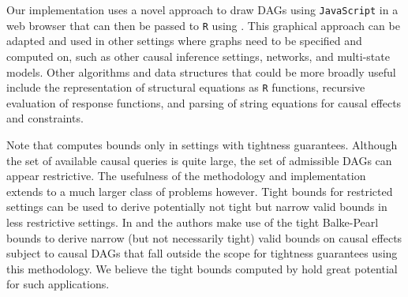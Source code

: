 Our implementation uses a novel approach to draw DAGs using \texttt{JavaScript} in a web browser that can then be passed to \texttt{R} using . This graphical approach can be adapted and used in other settings where graphs need to be specified and computed on, such as other causal inference settings, networks, and multi-state models. Other algorithms and data structures that could be more broadly useful include the representation of structural equations as \texttt{R} functions, recursive evaluation of response functions, and parsing of string equations for causal effects and constraints.

Note that  computes bounds only in settings with tightness guarantees. Although the set of available causal queries is quite large, the set of admissible DAGs can appear restrictive. The usefulness of the methodology and implementation extends to a much larger class of problems however. Tight bounds for restricted settings can be used to derive potentially not tight but narrow valid bounds in less restrictive settings. In \citet{kurokicai} and \citet{semipariv} the authors make use of the tight Balke-Pearl bounds to derive narrow (but not necessarily tight) valid bounds on causal effects subject to causal DAGs that fall outside the scope for tightness guarantees using this methodology. We believe the tight bounds computed by  hold great potential for such applications.



\address{%
Gustav Jonzon\\
Department of Medical Epidemiology and Biostatistics, Karolinska Institutet, Sweden\\%
\\
%
\url{https://ki.se/meb}\\%
%
\href{mailto:gustav.jonzon@ki.se}{\nolinkurl{gustav.jonzon@ki.se}}%
}

\address{%
Michael C Sachs\\
Department of Public Health, University of Copenhagen, Denmark\\%
\\
Supported in part by Novo Nordisk Fonden Grant NNF22OC0076595\\%
\\
%
\url{https://biostat.ku.dk/}\\%
\textit{ORCiD: \href{https://orcid.org/0000-0002-1279-8676}{0000-0002-1279-8676}}\\%
\href{mailto:michael.sachs@sund.ku.dk}{\nolinkurl{michael.sachs@sund.ku.dk}}%
}

\address{%
Erin E Gabriel\\
Department of Public Health, University of Copenhagen, Denmark\\%
\\
Supported in part by Novo Nordisk Fonden Grant NNF22OC0076595\\%
\\
%
\url{https://biostat.ku.dk/}\\%
\textit{ORCiD: \href{https://orcid.org/0000-0002-0504-8404}{0000-0002-0504-8404}}\\%
\href{mailto:erin.gabriel@sund.ku.dk}{\nolinkurl{erin.gabriel@sund.ku.dk}}%
}

